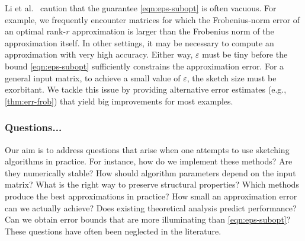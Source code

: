 \documentclass[final]{siamart1116}
\numberwithin{equation}{section}
\numberwithin{theorem}{section}
\numberwithin{figure}{section}
\newcommand{\eps}{\varepsilon}
\begin{document}
Li et al.~\cite[App.]{LLS+17:Algorithm-971}
caution that the guarantee \cref{eqn:eps-subopt} is often vacuous.
For example,
we frequently encounter matrices for which the Frobenius-norm
error of an optimal rank-$r$ approximation is larger than the Frobenius norm
of the approximation itself.  In other settings, it may be necessary
to compute an approximation with very high accuracy.
Either way, $\eps$ must be tiny before the bound \cref{eqn:eps-subopt}
sufficiently constrains the approximation error.
For a general input matrix, to achieve a small value of $\eps$, the sketch size must be exorbitant.
We tackle this issue by providing alternative error estimates (e.g., \cref{thm:err-frob}) that yield big improvements for
most examples.










\subsubsection{Questions...\nopunct}

Our aim is to address questions that arise
when one attempts to use sketching algorithms in practice.
For instance,
how do we implement these methods?  Are they numerically stable?
How should algorithm parameters depend on the input matrix?
What is the right way to preserve structural properties? Which methods produce the best approximations in practice?
How small an approximation error can we actually achieve?
Does existing theoretical analysis predict performance?
Can we obtain error bounds that are more illuminating than \cref{eqn:eps-subopt}?
These questions have often been neglected in the literature.
\end{document}
